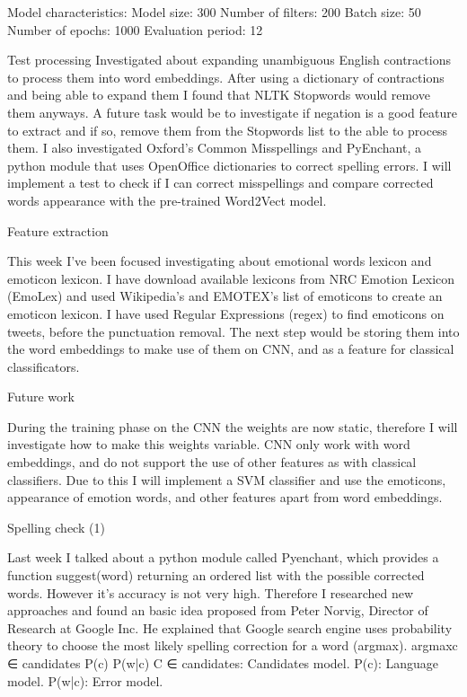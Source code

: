 Model characteristics:
Model size: 300
Number of filters: 200
Batch size: 50
Number of epochs: 1000
Evaluation period: 12

Test processing
Investigated about expanding unambiguous English contractions to process them into word embeddings. After using a dictionary of contractions and being able to expand them I found that NLTK Stopwords would remove them anyways. A future task would be to investigate if negation is a good feature to extract and if so, remove them from the Stopwords list to the able to process them.
I also investigated Oxford’s Common Misspellings and PyEnchant, a python module that uses OpenOffice dictionaries to correct spelling errors. I will implement a test to check if I can correct misspellings and compare corrected words appearance with the pre-trained Word2Vect model.

Feature extraction

This week I’ve been focused investigating about emotional words lexicon and emoticon lexicon. I have download available lexicons from NRC Emotion Lexicon (EmoLex) and used Wikipedia’s and EMOTEX’s list of emoticons to create an emoticon lexicon. I have used Regular Expressions (regex) to find emoticons on tweets, before the punctuation removal.
The next step would be storing them into the word embeddings to make use of them on CNN, and as a feature for classical classificators.

Future work

During the training phase on the CNN the weights are now static, therefore I will investigate how to make this weights variable.
CNN only work with word embeddings, and do not support the use of other features as with classical classifiers. Due to this I will implement a SVM classifier and use the emoticons, appearance of emotion words, and other features apart from word embeddings.

Spelling check (1)

Last week I talked about a python module called Pyenchant, which provides a function suggest(word) returning an ordered list with the possible corrected words. However it’s accuracy is not very high. Therefore I researched new approaches and found an basic idea proposed from Peter Norvig\cite{PeterNorvigSpell}, Director of Research at Google Inc. He explained that Google search engine uses probability theory to choose the most likely spelling correction for a word (argmax).
argmaxc ∈ candidates P(c) P(w|c)
C ∈ candidates: Candidates model.
P(c): Language model.
P(w|c): Error model.

